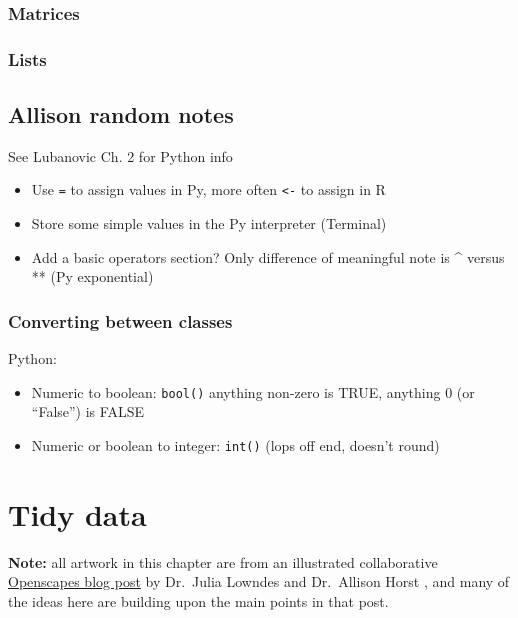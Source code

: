 \documentclass[
]{book}
\providecommand{\tightlist}{%
  \setlength{\itemsep}{0pt}\setlength{\parskip}{0pt}}
\begin{document}
\hypertarget{matrices}{%
\subsection{Matrices}\label{matrices}}

\hypertarget{lists}{%
\subsection{Lists}\label{lists}}

\hypertarget{allison-random-notes}{%
\section{Allison random notes}\label{allison-random-notes}}

See Lubanovic Ch. 2 for Python info

\begin{itemize}
\item
  Use \texttt{=} to assign values in Py, more often \texttt{\textless{}-} to assign in R
\item
  Store some simple values in the Py interpreter (Terminal)
\item
  Add a basic operators section? Only difference of meaningful note is \^{} versus ** (Py exponential)
\end{itemize}

\hypertarget{converting-between-classes}{%
\subsection{Converting between classes}\label{converting-between-classes}}

Python:

\begin{itemize}
\tightlist
\item
  Numeric to boolean: \texttt{bool()} anything non-zero is TRUE, anything 0 (or ``False'') is FALSE
\item
  Numeric or boolean to integer: \texttt{int()} (lops off end, doesn't round)
\end{itemize}

\hypertarget{tidydata}{%
\chapter{Tidy data}\label{tidydata}}

\textbf{Note:} all artwork in this chapter are from an illustrated collaborative \href{https://www.openscapes.org/blog/2020/10/12/tidy-data/}{Openscapes blog post} by Dr.~Julia Lowndes and Dr.~Allison Horst \citep{lowndes_tidy_2020}, and many of the ideas here are building upon the main points in that post.
\end{document}
